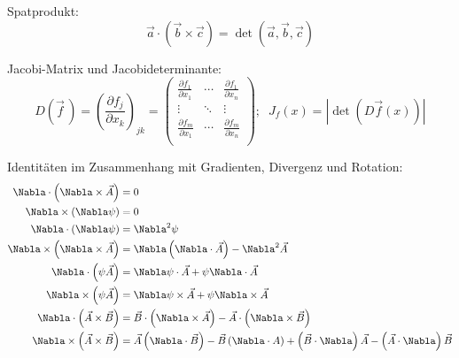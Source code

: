 \documentclass[11pt]{article}
\numberwithin{equation}{section}
\begin{document}
        Spatprodukt:
        \begin{equation}
          \vec{a}\cdot\left(\vec{b}\times\vec{c}\right) = \det\left(\vec{a},\vec{b},\vec{c}\right)
        \end{equation}

    		Jacobi-Matrix und Jacobideterminante:
    		\begin{equation}
    			D\left(\vec{f}\,\right) = \left(\frac{\partial f_j}{\partial x_k}\right)_{jk}
    			= \left(\begin{matrix}
    			\frac{\partial f_1}{\partial x_1} & \dotsb & \frac{\partial f_1}{\partial x_n} \\
    			\vdots & \ddots & \vdots \\
    			\frac{\partial f_m}{\partial x_1} & \dotsb & \frac{\partial f_m}{\partial x_n} \\
    			\end{matrix}\right);\;\;J_f(x)=\left|\det\left(D\vec{f}(x)\right)\right|
    		\end{equation}

        Identitäten im Zusammenhang mit Gradienten, Divergenz und Rotation:
    		\begin{equation}
          \begin{aligned}
            \Nabla\cdot\left(\Nabla\times\vec{A}\right) &= 0 \\
            \Nabla\times\left(\Nabla\psi\right) &= 0 \\
            \Nabla\cdot\left(\Nabla\psi\right) &= \Nabla^2\psi \\
            \Nabla\times\left(\Nabla\times\vec{A}\right) &= \Nabla\left(\Nabla\cdot\vec{A}\right) -\Nabla^2\vec{A} \\
            \Nabla\cdot\left(\psi\vec{A}\right) &= \Nabla\psi\cdot\vec{A} + \psi\Nabla\cdot\vec{A}\\
            \Nabla\times\left(\psi\vec{A}\right) &= \Nabla\psi\times\vec{A} + \psi\Nabla\times\vec{A} \\
            \Nabla\cdot\left(\vec{A}\times\vec{B}\right) &= \vec{B}\cdot\left(\Nabla\times\vec{A}\right) - \vec{A}\cdot\left(\Nabla\times\vec{B}\right) \\
            \Nabla\times\left(\vec{A}\times\vec{B}\right) &= \vec{A}\left(\Nabla\cdot\vec{B}\right) - \vec{B}\left(\Nabla\cdot{A}\right) + \left(\vec{B}\cdot\Nabla\right)\vec{A} - \left(\vec{A}\cdot\Nabla\right)\vec{B} \\
          \end{aligned}
    		\end{equation}
\end{document}
